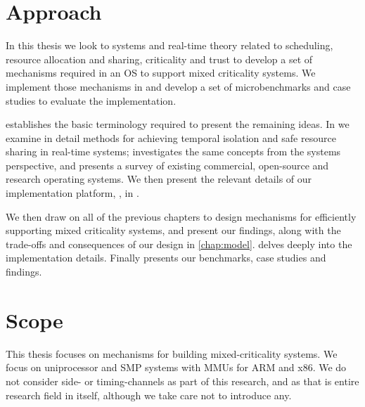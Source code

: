 \section{Approach}

In this thesis we look to systems and real-time theory related to scheduling, resource allocation
and sharing, criticality and trust to develop a set of mechanisms required in an \gls{OS} to 
support mixed criticality systems. We implement those mechanisms in \selfour and develop a set of
microbenchmarks and case studies to evaluate the implementation. 

 establishes the basic terminology required to present
the remaining ideas. In  we examine in detail methods for achieving temporal
isolation and safe resource sharing in real-time systems;  investigates
the same concepts from the systems perspective, and presents a survey of existing commercial, open-source
and research operating systems. We then present the relevant details of our implementation platform,
\selfour, in .

We then draw on all of the previous chapters to design mechanisms for efficiently supporting mixed
criticality systems, and present our findings, along with the trade-offs and consequences of our
design in \cref{chap:model}.   delves deeply into the implementation details.
Finally  presents our benchmarks, case studies and findings. 

\section{Scope}

This thesis focuses on mechanisms for building mixed-criticality systems. 
We focus on uniprocessor and \gls{SMP} systems with \glspl{MMU} for ARM and x86.
We do not consider side- or timing-channels as part of this research, and as that is entire research
field in itself, although we take care not to introduce any.
